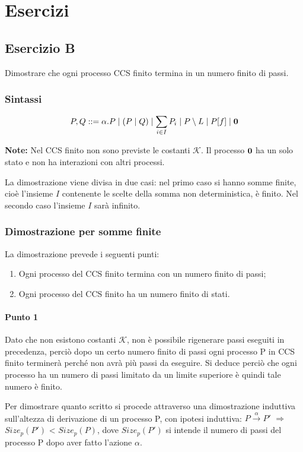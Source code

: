 \section{Esercizi}
\subsection{Esercizio B} 
Dimostrare che ogni processo CCS finito termina in un numero finito di passi.

\subsubsection{Sintassi}

\[
	P, Q ::=
	\alpha.P\mid
	(P\mid Q)\mid
	\sum_{i\in I} P_i\mid
	P\setminus L\mid
	P[f]\mid
	\mathbf{0}
\] 

\textbf{Note:} Nel CCS finito non sono previste le costanti $\mathcal{K}$. Il processo \(\mathbf{0}\) ha un solo stato e non ha interazioni con altri processi.

La dimostrazione viene divisa in due casi: nel primo caso si hanno somme finite, cioè l'insieme \(I\) contenente le scelte della somma non deterministica, è finito. Nel secondo caso l'insieme \(I\) sarà infinito.

\subsubsection{Dimostrazione per somme finite}

La dimostrazione prevede i seguenti punti:
\begin{enumerate}
	\item Ogni processo del CCS finito termina con un numero finito di passi;
	\item Ogni processo del CCS finito ha un numero finito di stati.
\end{enumerate}

\paragraph{Punto 1} \mbox{}

Dato che non esistono costanti $\mathcal{K}$, non è possibile rigenerare passi eseguiti in precedenza, perciò dopo un certo numero finito di passi ogni processo P in CCS finito terminerà perché non avrà più passi da eseguire. Si deduce perciò che ogni processo ha un numero di passi limitato da un limite superiore è quindi tale numero è finito.

Per dimostrare quanto scritto si procede attraverso una dimostrazione induttiva sull'altezza di derivazione di un processo P, con ipotesi induttiva: \(P \overset{\alpha}\rightarrow P'\) $\Rightarrow$ $Size_{p}(P')$ < $Size_{p}(P)$, dove $Size_{p}(P')$ si intende il numero di passi del processo P dopo aver fatto l'azione $\alpha$.

